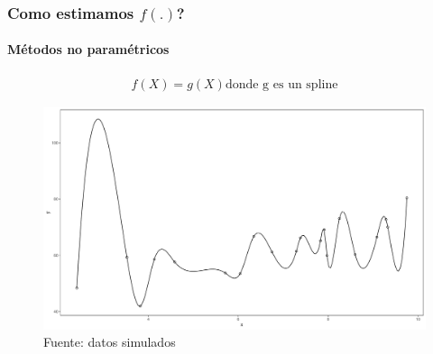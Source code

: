 \documentclass[
  shownotes,
  xcolor={svgnames},
  hyperref={colorlinks,citecolor=DarkBlue,linkcolor=DarkRed,urlcolor=DarkBlue}
  , aspectratio=169]{beamer}
\begin{document}
\begin{frame}
\frametitle{Como estimamos $f(.)$?}
\framesubtitle{Métodos no paramétricos}

\begin{align}
  f(X)=g(X) \text{donde g es un spline}
\end{align}

\begin{figure}[H] \centering
  \centering
  \includegraphics[scale=0.2]{figures/fig_1c.pdf}
  \\
  \tiny
 Fuente: datos simulados
\end{figure}

\end{frame}
\end{document}
